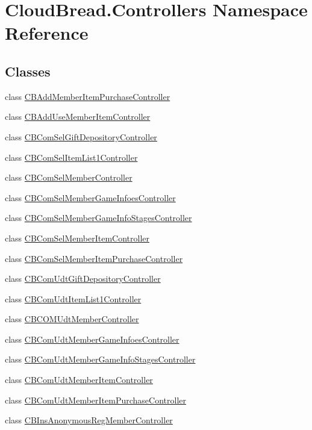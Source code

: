 \hypertarget{a00410}{}\section{Cloud\+Bread.\+Controllers Namespace Reference}
\label{a00410}
\subsection*{Classes}
\begin{DoxyCompactItemize}
\item 
class \hyperlink{a00023}{C\+B\+Add\+Member\+Item\+Purchase\+Controller}
\item 
class \hyperlink{a00024}{C\+B\+Add\+Use\+Member\+Item\+Controller}
\item 
class \hyperlink{a00027}{C\+B\+Com\+Sel\+Gift\+Depository\+Controller}
\item 
class \hyperlink{a00028}{C\+B\+Com\+Sel\+Item\+List1\+Controller}
\item 
class \hyperlink{a00029}{C\+B\+Com\+Sel\+Member\+Controller}
\item 
class \hyperlink{a00030}{C\+B\+Com\+Sel\+Member\+Game\+Infoes\+Controller}
\item 
class \hyperlink{a00031}{C\+B\+Com\+Sel\+Member\+Game\+Info\+Stages\+Controller}
\item 
class \hyperlink{a00032}{C\+B\+Com\+Sel\+Member\+Item\+Controller}
\item 
class \hyperlink{a00033}{C\+B\+Com\+Sel\+Member\+Item\+Purchase\+Controller}
\item 
class \hyperlink{a00034}{C\+B\+Com\+Udt\+Gift\+Depository\+Controller}
\item 
class \hyperlink{a00035}{C\+B\+Com\+Udt\+Item\+List1\+Controller}
\item 
class \hyperlink{a00036}{C\+B\+C\+O\+M\+Udt\+Member\+Controller}
\item 
class \hyperlink{a00037}{C\+B\+Com\+Udt\+Member\+Game\+Infoes\+Controller}
\item 
class \hyperlink{a00038}{C\+B\+Com\+Udt\+Member\+Game\+Info\+Stages\+Controller}
\item 
class \hyperlink{a00039}{C\+B\+Com\+Udt\+Member\+Item\+Controller}
\item 
class \hyperlink{a00040}{C\+B\+Com\+Udt\+Member\+Item\+Purchase\+Controller}
\item 
class \hyperlink{a00041}{C\+B\+Ins\+Anonymous\+Reg\+Member\+Controller}
\item 

\end{DoxyCompactItemize}
